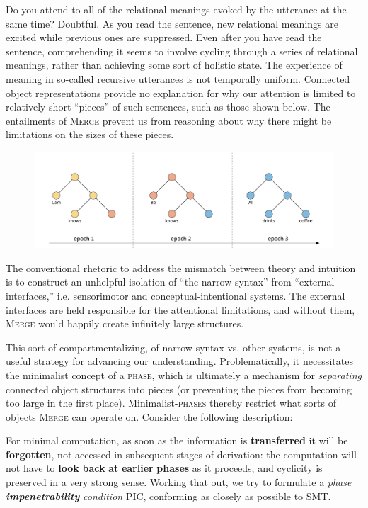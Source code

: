   Do you attend to all of the relational meanings evoked by the utterance at the same time? Doubtful. As you read the sentence, new relational meanings are excited while previous ones are suppressed. Even after you have read the sentence, comprehending it seems to involve cycling through a series of relational meanings, rather than achieving some sort of holistic state. The experience of meaning in so-called recursive utterances is not temporally uniform. Connected object representations provide no explanation for why our attention is limited to relatively short “pieces” of such sentences, such as those shown below. The entailments of \textsc{Merge} prevent us from reasoning about why there might be limitations on the sizes of these pieces.

  
\begin{figure}
\includegraphics[width=\textwidth]{figures/Tilsen-img111.png}
\caption{\missingcaption}
\label{fig:}
\end{figure}
 

  The conventional rhetoric to address the mismatch between theory and intuition is to construct an unhelpful isolation of “the narrow syntax” from “external interfaces,” i.e. sensorimotor and conceptual-intentional systems. The external interfaces are held responsible for the attentional limitations, and without them, \textsc{Merge} would happily create infinitely large structures. 

  This sort of compartmentalizing, of narrow syntax vs. other systems, is not a useful strategy for advancing our understanding. Problematically, it necessitates the minimalist concept of a \textsc{phase}, which is ultimately a mechanism for \textit{separating} connected object structures into pieces (or preventing the pieces from becoming too large in the first place). Minimalist-\textsc{phases} thereby restrict what sorts of objects \textsc{Merge} can operate on. Consider the following description:

For minimal computation, as soon as the information is \textbf{transferred} it will be \textbf{forgotten}, not accessed in subsequent stages of derivation: the computation will not have to \textbf{look} \textbf{back} \textbf{at} \textbf{earlier} \textbf{phases} as it proceeds, and cyclicity is preserved in a very strong sense. Working that out, we try to formulate a \textit{phase} \textbf{\textit{impenetrability}} \textit{condition} PIC, conforming as closely as possible to SMT. \citep{Chomsky2008}

